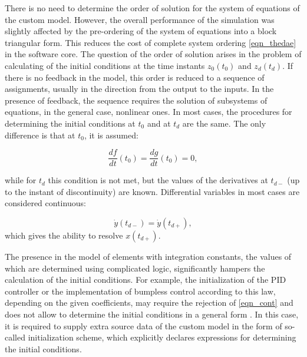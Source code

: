 \documentclass[lettersize,journal]{IEEEtran}
\begin{document}
There is no need to determine the order of solution for the system of equations of the custom model.
However, the overall performance of the simulation was slightly affected by the pre-ordering of the system of
equations into a block triangular form. This reduces the cost of complete system ordering 
\eqref{eqn_thedae} in the software core. The question of the order of solution arises in the problem of
calculating of the initial conditions at the time instants \(z_0 (t_0)\) and \(z_d (t_d)\). 
If there is no feedback in the model, this order is reduced to a sequence of assignments, usually in the
direction from the output to the inputs. In the presence of feedback, the sequence requires the solution of
subsystems of equations, in the general case, nonlinear ones. In most cases, the procedures for determining the
initial conditions at \(t_0\) and at \(t_d\) are the same. The only difference is that at \(t_0\), it is assumed:

\begin{equation}
	\label{eqn_opthree2}
	\frac{df}{dt}(t_0)=\frac{dg}{dt}(t_0)=0,
\end{equation}

\noindent while for \(t_d \) this condition is not met, but the values of the derivatives at 
\(t_{d-}\) (up to the instant of discontinuity) are known. Differential variables in most cases are considered continuous:

\begin{equation}
	\label{eqn_cont}
	\dot{y}(t_{d-})=\dot{y}(t_{d+}),
\end{equation}
\noindent which gives the ability to resolve \(x(t_{d+})\).

The presence in the model of elements with integration constants, the values of which are determined using complicated logic,
significantly hampers the calculation of the initial conditions. For example, the initialization of the PID controller or the
implementation of bumpless control according to this law, depending on the given coefficients, may require the rejection of 
\eqref{eqn_cont} and does not allow to determine the initial conditions in a general form \cite{texbook}. In this case, 
it is required to supply extra source data of the custom model in the form of so-called initialization scheme, which explicitly
declares expressions for determining the initial conditions.
\end{document}
